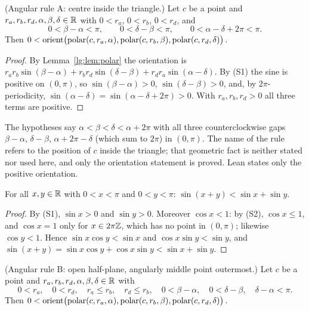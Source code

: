 \begin{lemma}\label{lg:lem:ruleA}
(Angular rule A: centre inside the triangle.)
Let $c$ be a point and $r_a,r_b,r_d,\alpha,\beta,\delta\in\mathbb R$ with $0<r_a$, $0<r_b$, $0<r_d$, and
\[
  0<\beta-\alpha<\pi,\qquad 0<\delta-\beta<\pi,\qquad 0<\alpha-\delta+2\pi<\pi .
\]
Then $0<\operatorname{orient}\bigl(\operatorname{polar}(c,r_a,\alpha),\operatorname{polar}(c,r_b,\beta),\operatorname{polar}(c,r_d,\delta)\bigr)$.
\end{lemma}

\begin{proof}
By Lemma~\ref{lg:lem:polar} the orientation is $r_ar_b\sin(\beta-\alpha)+r_br_d\sin(\delta-\beta)+r_dr_a\sin(\alpha-\delta)$.
By (S1) the sine is positive on $(0,\pi)$, so $\sin(\beta-\alpha)>0$, $\sin(\delta-\beta)>0$, and, by
$2\pi$-periodicity, $\sin(\alpha-\delta)=\sin(\alpha-\delta+2\pi)>0$. With $r_a,r_b,r_d>0$ all three terms are
positive.
\end{proof}

The hypotheses say $\alpha<\beta<\delta<\alpha+2\pi$ with all three counterclockwise gaps $\beta-\alpha$,
$\delta-\beta$, $\alpha+2\pi-\delta$ (which sum to $2\pi$) in $(0,\pi)$. The name of the rule refers to the position of
$c$ inside the triangle; that geometric fact is neither stated nor used here, and only the orientation statement is
proved. Lean states only the positive orientation.

\begin{lemma}\label{lg:lem:sinadd}
For all $x,y\in\mathbb R$ with $0<x<\pi$ and $0<y<\pi$: $\sin(x+y)<\sin x+\sin y$.
\end{lemma}

\begin{proof}
By (S1), $\sin x>0$ and $\sin y>0$. Moreover $\cos x<1$: by (S2), $\cos x\le1$, and $\cos x=1$ only for
$x\in2\pi\mathbb Z$, which has no point in $(0,\pi)$; likewise $\cos y<1$. Hence $\sin x\cos y<\sin x$ and $\cos x\sin y<\sin y$, and
$\sin(x+y)=\sin x\cos y+\cos x\sin y<\sin x+\sin y$.
\end{proof}

\begin{lemma}\label{lg:lem:ruleB}
(Angular rule B: open half-plane, angularly middle point outermost.)
Let $c$ be a point and $r_a,r_b,r_d,\alpha,\beta,\delta\in\mathbb R$ with
\[
  0<r_a,\quad 0<r_d,\quad r_a\le r_b,\quad r_d\le r_b,\quad 0<\beta-\alpha,\quad 0<\delta-\beta,\quad \delta-\alpha<\pi .
\]
Then $0<\operatorname{orient}\bigl(\operatorname{polar}(c,r_a,\alpha),\operatorname{polar}(c,r_b,\beta),\operatorname{polar}(c,r_d,\delta)\bigr)$.
\end{lemma}

